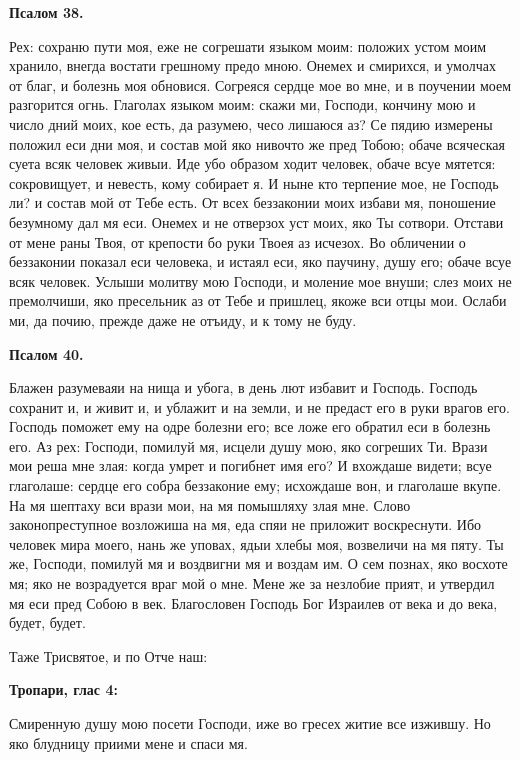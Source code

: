 \medskip


\bfseries Псалом 38.\normalfont{}


Рех: сохраню пути моя, еже не согрешати языком моим: положих устом моим хранило, внегда востати грешному предо мною. Онемех и смирихся, и умолчах от благ, и болезнь моя обновися. Согреяся сердце мое во мне, и в поучении моем разгорится огнь. Глаголах языком моим: скажи ми, Господи, кончину мою и число дний моих, кое есть, да разумею, чесо лишаюся аз? Се пядию измерены положил еси дни моя, и состав мой яко нивочто же пред Тобою; обаче всяческая суета всяк человек живыи. Иде убо образом ходит человек, обаче всуе мятется: сокровищует, и невесть, кому собирает я. И ныне кто терпение мое, не Господь ли? и состав мой от Тебе есть. От всех беззаконии моих избави мя, поношение безумному дал мя еси. Онемех и не отверзох уст моих, яко Ты сотвори. Отстави от мене раны Твоя, от крепости бо руки Твоея аз исчезох. Во обличении о беззаконии показал еси человека, и истаял еси, яко паучину, душу его; обаче всуе всяк человек. Услыши молитву мою Господи, и моление мое внуши; слез моих не премолчиши, яко пресельник аз от Тебе и пришлец, якоже вси отцы мои. Ослаби ми, да почию, прежде даже не отъиду, и к тому не буду.


\medskip


\bfseries Псалом 40.\normalfont{}


Блажен разумеваяи на нища и убога, в день лют избавит и Господь. Господь сохранит и, и живит и, и ублажит и на земли, и не предаст его в руки врагов его. Господь поможет ему на одре болезни его; все ложе его обратил еси в болезнь его. Аз рех: Господи, помилуй мя, исцели душу мою, яко согреших Ти. Врази мои реша мне злая: когда умрет и погибнет имя его? И вхождаше видети; всуе глаголаше: сердце его собра беззаконие ему; исхождаше вон, и глаголаше вкупе. На мя шептаху вси врази мои, на мя помышляху злая мне. Слово законопреступное возложиша на мя, еда спяи не приложит воскреснути. Ибо человек мира моего, нань же уповах, ядыи хлебы моя, возвеличи на мя пяту. Ты же, Господи, помилуй мя и воздвигни мя и воздам им. О сем познах, яко восхоте мя; яко не возрадуется враг мой о мне. Мене же за незлобие прият, и утвердил мя еси пред Собою в век. Благословен Господь Бог Израилев от века и до века, будет, будет.

Таже Трисвятое, и по Отче наш:


\medskip


\bfseries Тропари, глас 4:\normalfont{}


Смиренную душу мою посети Господи, иже во гресех  житие все изжившу. Но яко  блудницу приими мене и спаси мя.

